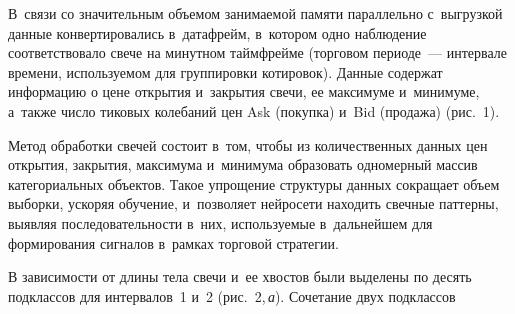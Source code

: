 {\begin{multicols}{2}
\vspace*{3pt}

   
   
   

В~связи со значительным объемом занимаемой 
памяти параллельно с~выгрузкой данные конвертировались в~датафрейм, в~котором одно наблюдение 
соответствовало свече на минутном таймфрейме (торговом периоде~--- интервале времени, используемом для 
группировки котировок). Данные содержат информацию о цене открытия и~закрытия свечи, ее максимуме 
и~минимуме, а~также чис\-ло тиковых колебаний цен Ask (покупка) и~Bid (продажа) (рис.~1).
  
  Метод обработки свечей состоит в~том, чтобы из количественных данных цен открытия, 
закрытия, максимума и~минимума образовать одномерный массив категориальных объектов. 
Такое упрощение структуры данных сокращает объем выборки, ускоряя обучение, 
и~позволяет нейросети находить свечные паттерны, выявляя последовательности в~них, 
используемые в~дальнейшем для формирования сигналов в~рамках торговой стратегии.

 В зависимости от длины тела свечи и~ее хвостов были выделены по десять подклассов для 
интервалов~1 и~2 (рис.~2,\,\textit{а}). Сочетание двух подклассов\linebreak\vspace*{-12pt}

\pagebreak 

\end{multicols}

\begin{figure*} %
   \vspace*{1pt}
  \begin{center}  
    \mbox{%
\epsfxsize=136.465mm
}

\end{center}
\vspace*{-9pt}
\vspace*{12pt}
  \begin{center}  
    \mbox{%
\epsfxsize=161.084mm
}

\end{center}
\vspace*{-12pt}
\end{figure*}

}
